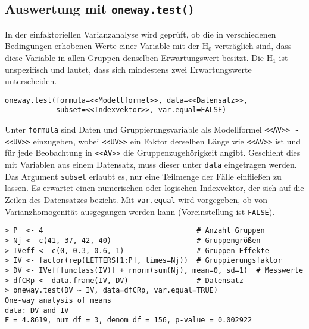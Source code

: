 \subsection{Auswertung mit \texttt{oneway.test()}}
\label{sec:oneway}

In der einfaktoriellen Varianzanalyse wird geprüft, ob die in verschiedenen Bedingungen erhobenen Werte einer Variable mit der $\text{H}_{0}$ verträglich sind, dass diese Variable in allen Gruppen denselben Erwartungswert besitzt. Die $\text{H}_{1}$ ist unspezifisch und lautet, dass sich mindestens zwei Erwartungswerte unterscheiden.
\begin{lstlisting}
oneway.test(formula=<<Modellformel>>, data=<<Datensatz>>,
            subset=<<Indexvektor>>, var.equal=FALSE)
\end{lstlisting}

Unter \lstinline!formula! sind Daten und Gruppierungsvariable als Modellformel \lstinline!<<AV>> ~ <<UV>>! einzugeben, wobei \lstinline!<<UV>>! ein Faktor derselben Länge wie \lstinline!<<AV>>! ist und für jede Beobachtung in \lstinline!<<AV>>! die Gruppenzugehörigkeit angibt. Geschieht dies mit Variablen aus einem Datensatz, muss dieser unter \lstinline!data! eingetragen werden. Das Argument \lstinline!subset! erlaubt es, nur eine Teilmenge der Fälle einfließen zu lassen. Es erwartet einen numerischen oder logischen Indexvektor, der sich auf die Zeilen des Datensatzes bezieht. Mit \lstinline!var.equal! wird vorgegeben, ob von Varianzhomogenität ausgegangen werden kann (Voreinstellung ist \lstinline!FALSE!).
\begin{lstlisting}
> P  <- 4                                    # Anzahl Gruppen
> Nj <- c(41, 37, 42, 40)                    # Gruppengrößen
> IVeff <- c(0, 0.3, 0.6, 1)                 # Gruppen-Effekte
> IV <- factor(rep(LETTERS[1:P], times=Nj))  # Gruppierungsfaktor
> DV <- IVeff[unclass(IV)] + rnorm(sum(Nj), mean=0, sd=1)  # Messwerte
> dfCRp <- data.frame(IV, DV)                # Datensatz
> oneway.test(DV ~ IV, data=dfCRp, var.equal=TRUE)
One-way analysis of means
data: DV and IV
F = 4.8619, num df = 3, denom df = 156, p-value = 0.002922
\end{lstlisting}

